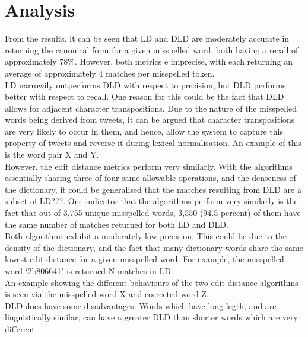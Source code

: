 \documentclass[11pt]{article}
\begin{document}
\section{Analysis}


From the results, it can be seen that LD and DLD are moderately accurate in returning the canonical form for a given misspelled word, both having a recall of approximately 78\%. However, both metrics e imprecise, with each returning an average of approximately 4 matches per misspelled token.
\\


LD narrowily outperforms DLD with respect to precision, but DLD performs better with respect to recall. One reason for this could be the fact that  DLD allows for adjacent character transpositions. Due to the nature of the misspelled words being derived from tweets, it can be argued that character transpositions are very likely to occur in them, and hence, allow the system to capture this property of tweets and reverse it during lexical normalisation. An example of this is the word pair X and Y.
\\

However, the edit distance metrics perform very similarly. With the algorithms essentially sharing three of four same allowable operations, and the denseness of the dictionary, it could be generalised that the matches  resulting from DLD are a subset of LD???. One indicator that the algorithms perform very similarly is the fact that out of 3,755 unique misspelled words, 3,550 (94.5 percent) of them have the same number of matches returned for both LD and DLD.
\\

Both algorithms exhibit a moderately low precision. This could be due to the density of the dictionary, and the fact that many dictionary words share the same lowest edit-distance for a given misspelled word. For example, the misspelled word `2b806641' is returned N matches in LD.
\\

An example showing the different behaviours of the two edit-distance algorithms is seen via the misspelled word X and corrected word Z.
\\

DLD does have some disadvantages. Words which have long legth, and are linguistically similar, can have a greater DLD than shorter words which are very different.
\end{document}
